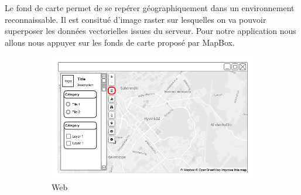 Le fond de carte permet de se repérer géographiquement dans un environnement reconnaissable. Il est consitué d'image raster sur lesquelles on va pouvoir superposer les données vectorielles issues du serveur. Pour notre application nous allons nous appuyer sur les fonds de carte proposé par MapBox.



\begin{figure}[ht]
  \centering
  \begin{subfigure}[b]{0.6\textwidth}
    \includegraphics[width=\textwidth]
      {img/c02-application/png/web-basemap-toc.png}
    \caption{Web}
  \end{subfigure}
  ~
  \begin{subfigure}[b]{0.2\textwidth}

\end{subfigure}
\end{figure}
